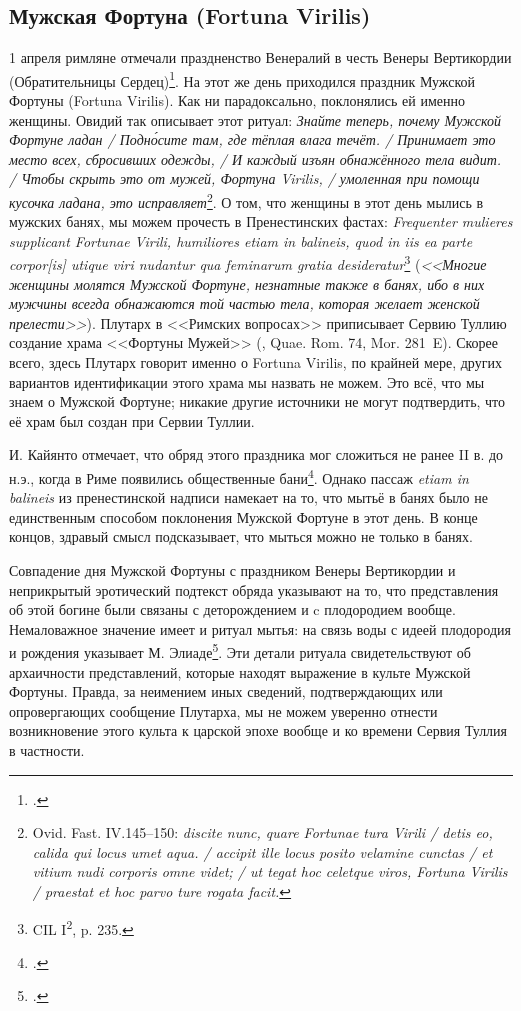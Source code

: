 \subsection{Мужская Фортуна (Fortuna Virilis)}\label{FortunaVirilis}

1 апреля римляне отмечали праздненство Венералий в честь Венеры Вертикордии (Обратительницы Сердец)\footcites[Pp. 67--69]{Fowler1899}[Pp. 96--97]{Scullard1981}. На этот же день приходился праздник Мужской Фортуны (Fortuna Virilis). Как ни парадоксально, поклонялись ей именно женщины. Овидий так описывает этот ритуал: \textit{Знайте теперь, почему Мужской Фортуне ладан / Подн\'{о}сите там, где тёплая влага течёт. / Принимает это место всех, сбросивших одежды, / И каждый изъян обнажённого тела видит. / Чтобы скрыть это от мужей, Фортуна Virilis, / умоленная при помощи кусочка ладана, это исправляет}\footnote{Ovid. Fast. IV.145--150: \textit{ discite nunc, quare Fortunae tura Virili / 
detis eo, calida qui locus umet aqua. / 
accipit ille locus posito velamine cunctas / 
et vitium nudi corporis omne videt; / 
ut tegat hoc celetque viros, Fortuna Virilis / 
praestat et hoc parvo ture rogata facit.}}. О том, что женщины в этот день мылись в мужских банях, мы можем прочесть в Пренестинских фастах: \textit{Frequenter mulieres supplicant Fortunae Virili, humiliores etiam in balineis, quod in iis ea parte corpor[is] utique viri nudantur qua feminarum gratia desideratur}\footnote{CIL I\textsuperscript{2}, p. 235.} (\textit{<<Многие женщины молятся Мужской Фортуне, незнатные также в банях, ибо в них мужчины всегда обнажаются той частью тела, которая желает женской прелести>>}). Плутарх в <<Римских вопросах>> приписывает Сервию Туллию создание храма <<Фортуны Мужей>> (, Quae. Rom. 74, Mor. 281~E). Скорее всего, здесь Плутарх говорит именно о Fortuna Virilis, по крайней мере, других вариантов идентификации этого храма мы назвать не можем. Это всё, что мы знаем о Мужской Фортуне; никакие другие источники не могут подтвердить, что её храм был создан при Сервии Туллии.

И. Кайянто отмечает, что обряд этого праздника мог сложиться не ранее II в. до н.э., когда в Риме появились общественные бани\footcite[P. 504]{Kajanto1981}. Однако пассаж \textit{etiam in balineis} из пренестинской надписи намекает на то, что мытьё в банях было не единственным способом поклонения Мужской Фортуне в этот день. В конце концов, здравый смысл подсказывает, что мыться можно не только в банях.

Совпадение дня Мужской Фортуны с праздником Венеры Вертикордии и неприкрытый эротический подтекст обряда указывают на то, что представления об этой богине были связаны с деторождением и c плодородием вообще. Немаловажное значение имеет и ритуал мытья: на связь воды с идеей плодородия и рождения указывает М. Элиаде\footcite[С. 183 и далее]{Eliade1999}. Эти детали ритуала свидетельствуют об архаичности представлений, которые находят выражение в культе Мужской Фортуны. Правда, за неимением иных сведений, подтверждающих или опровергающих сообщение Плутарха, мы не можем уверенно отнести возникновение этого культа к царской эпохе вообще и ко времени Сервия Туллия в частности.

